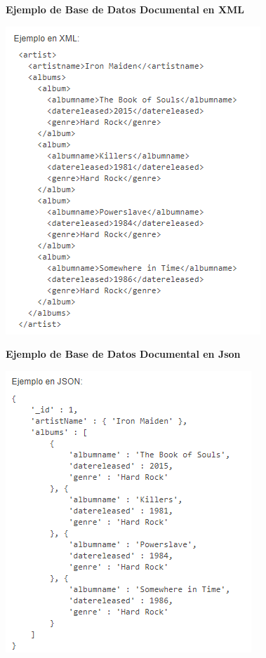 \documentclass[twoside,onecolumn]{article}
\begin{document}
\begin{flushright}
\begin{itemize}
\textbf{Ejemplo de Base de Datos Documental en XML}\\
\begin{center}
\includegraphics[scale=0.7]{Imagenes/EjemploDocumental.png}
\end{center}	

\textbf{Ejemplo de Base de Datos Documental en Json}\\
\begin{center}
\includegraphics[scale=0.7]{Imagenes/EjemploDocumentalJson.png}
\end{center}


\end{itemize}
\end{flushright}
\end{document}
